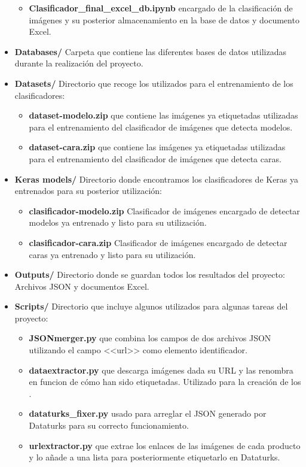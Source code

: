 \begin{itemize}
\begin{itemize}
            \item \textbf{Clasificador\_final\_excel\_db.ipynb}  encargado de la clasificación de imágenes y su posterior almacenamiento en la base de datos y documento Excel.
        \end{itemize}
    \item \textbf{Databases/} Carpeta que contiene las diferentes bases de datos utilizadas durante la realización del proyecto.
    \item \textbf{Datasets/} Directorio que recoge los  utilizados para el entrenamiento de los clasificadores:
        \begin{itemize}
            \item \textbf{dataset-modelo.zip}  que contiene las imágenes ya etiquetadas utilizadas para el entrenamiento del clasificador de imágenes que detecta modelos.
            \item \textbf{dataset-cara.zip}  que contiene las imágenes ya etiquetadas utilizadas para el entrenamiento del clasificador de imágenes que detecta caras.
        \end{itemize}
    \item \textbf{Keras models/} Directorio donde encontramos los clasificadores de Keras ya entrenados para su posterior utilización:
        \begin{itemize}
            \item \textbf{clasificador-modelo.zip} Clasificador de imágenes encargado de detectar modelos ya entrenado y listo para su utilización.
            \item \textbf{clasificador-cara.zip} Clasificador de imágenes encargado de detectar caras ya entrenado y listo para su utilización.
        \end{itemize}
    \item \textbf{Outputs/} Directorio donde se guardan todos los resultados del proyecto: Archivos JSON y documentos Excel.
    \item \textbf{Scripts/} Directorio que incluye algunos  utilizados para algunas tareas del proyecto:
        \begin{itemize}
            \item \textbf{JSONmerger.py}  que combina los campos de dos archivos JSON utilizando el campo <<url>> como elemento identificador.
            \item \textbf{dataextractor.py}  que descarga imágenes dada su URL y las renombra en funcion de cómo han sido etiquetadas. Utilizado para la creación de los .
            \item \textbf{dataturks\_fixer.py}  usado para arreglar el JSON generado por Dataturks para su correcto funcionamiento.
            \item \textbf{url\-extractor.py}  que extrae los enlaces de las imágenes de cada producto y lo añade a una lista para posteriormente etiquetarlo en Dataturks.
        \end{itemize}
\end{itemize}

